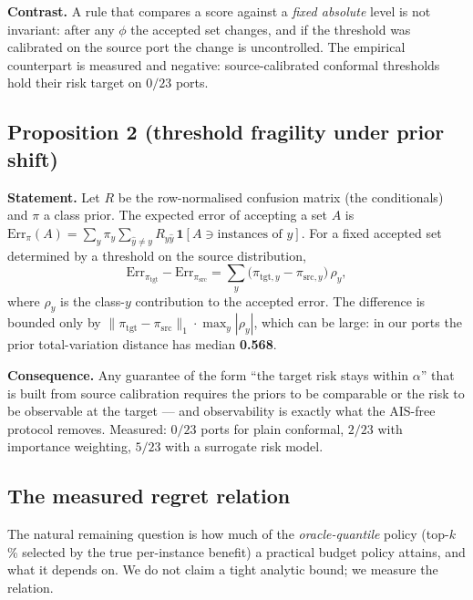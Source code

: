 \documentclass[journal]{IEEEtran}
\begin{document}
\textbf{Contrast.} A rule that compares a score against a \emph{fixed absolute} level is not invariant:
after any $\phi$ the accepted set changes, and if the threshold was calibrated on the source port the
change is uncontrolled. The empirical counterpart is measured and negative: source-calibrated
conformal thresholds hold their risk target on $0/23$ ports.

\subsection{Proposition 2 (threshold fragility under prior shift)}

\textbf{Statement.} Let $R$ be the row-normalised confusion matrix (the conditionals) and $\pi$ a
class prior. The expected error of accepting a set $A$ is
$\mathrm{Err}_\pi(A) = \sum_y \pi_y \sum_{\hat y \neq y} R_{y\hat y}\,
\mathbf{1}[A \ni \text{instances of } y]$. For a fixed accepted set determined by a threshold on the
source distribution,
\begin{equation}
\mathrm{Err}_{\pi_{\text{tgt}}} - \mathrm{Err}_{\pi_{\text{src}}}
= \sum_y \big(\pi_{\text{tgt},y} - \pi_{\text{src},y}\big)\, \rho_y ,
\end{equation}
where $\rho_y$ is the class-$y$ contribution to the accepted error. The difference is bounded only by
$\|\pi_{\text{tgt}} - \pi_{\text{src}}\|_1 \cdot \max_y |\rho_y|$, which can be large: in our ports the
prior total-variation distance has median \textbf{0.568}.

\textbf{Consequence.} Any guarantee of the form ``the target risk stays within $\alpha$'' that is
built from source calibration requires the priors to be comparable or the risk to be observable at the
target --- and observability is exactly what the AIS-free protocol removes. Measured: $0/23$ ports for
plain conformal, $2/23$ with importance weighting, $5/23$ with a surrogate risk model.

\subsection{The measured regret relation}
\label{sec:regret}

The natural remaining question is how much of the \emph{oracle-quantile} policy (top-$k$\,\% selected
by the true per-instance benefit) a practical budget policy attains, and what it depends on. We do not
claim a tight analytic bound; we measure the relation.
\end{document}

